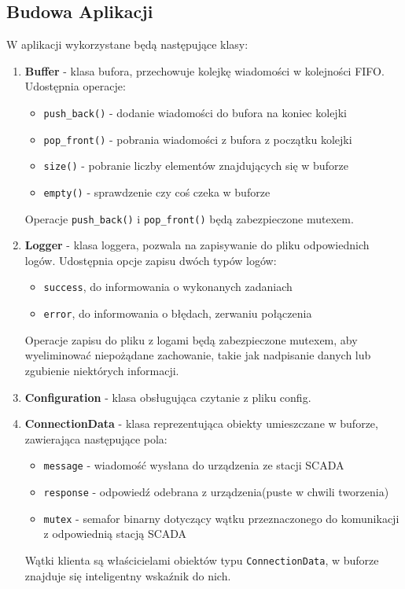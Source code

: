 \documentclass[a4paper]{article}
\begin{document}
\subsection{Budowa Aplikacji}
W aplikacji wykorzystane będą następujące klasy:
\begin{enumerate}
\item \textbf{Buffer} - klasa bufora, przechowuje kolejkę wiadomości w kolejności FIFO. Udostępnia operacje:
\begin{itemize}
\item \texttt{push\_back()} - dodanie wiadomości do bufora na koniec kolejki
\item \texttt{pop\_front()} - pobrania wiadomości z bufora z początku kolejki
\item \texttt{size()} - pobranie liczby elementów znajdujących się w buforze
\item \texttt{empty()} - sprawdzenie czy coś czeka w buforze
\end{itemize}
Operacje \texttt{push\_back()} i \texttt{pop\_front()} będą zabezpieczone mutexem.
\item \textbf{Logger} - klasa loggera, pozwala na zapisywanie do pliku odpowiednich logów. Udostępnia opcje zapisu dwóch typów logów:
\begin{itemize}
\item \texttt{success}, do informowania o wykonanych zadaniach
\item \texttt{error}, do informowania o błędach, zerwaniu połączenia
\end{itemize}
Operacje zapisu do pliku z logami będą zabezpieczone mutexem, aby wyeliminować niepożądane zachowanie, takie jak nadpisanie danych lub zgubienie niektórych informacji.
\item \textbf{Configuration} - klasa obsługująca czytanie z pliku config.
\item \textbf{ConnectionData} - klasa reprezentująca obiekty umieszczane w buforze, zawierająca następujące pola:
\begin{itemize}
\item \texttt{message} - wiadomość wysłana do urządzenia ze stacji SCADA
\item \texttt{response} - odpowiedź odebrana z urządzenia(puste w chwili tworzenia)
\item \texttt{mutex} - semafor binarny dotyczący wątku przeznaczonego do komunikacji z odpowiednią stacją SCADA
\end{itemize}
Wątki klienta są właścicielami obiektów typu \texttt{ConnectionData}, w buforze znajduje się inteligentny wskaźnik do nich.

\end{enumerate}
\end{document}
